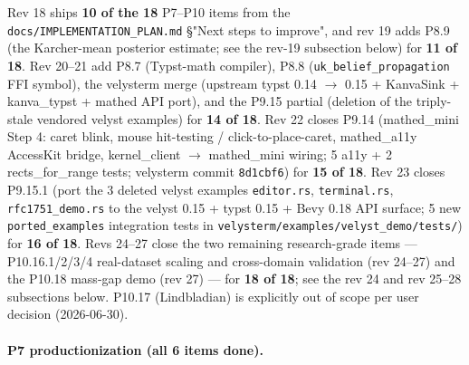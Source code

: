 \documentclass[11pt, a4paper]{article}
\begin{document}
Rev 18 ships \textbf{10 of the 18} P7--P10 items from the
\texttt{docs/IMPLEMENTATION\_PLAN.md} \S"Next steps to improve",
  and rev 19 adds P8.9 (the Karcher-mean posterior estimate; see the
rev-19 subsection below) for \textbf{11 of 18}.
Rev 20--21 add P8.7 (Typst-math compiler), P8.8
(\texttt{uk\_belief\_propagation} FFI symbol), the velysterm
merge (upstream typst 0.14 $\to$ 0.15 + KanvaSink + kanva\_typst
+ mathed API port), and the P9.15 partial (deletion of the
triply-stale vendored velyst examples) for \textbf{14 of 18}.
Rev 22 closes P9.14 (mathed\_mini Step 4: caret blink,
mouse hit-testing / click-to-place-caret, mathed\_a11y
AccessKit bridge, kernel\_client $\to$ mathed\_mini wiring;
5 a11y + 2 rects\_for\_range tests; velysterm commit
\texttt{8d1cbf6}) for \textbf{15 of 18}.
Rev 23 closes P9.15.1 (port the 3 deleted velyst examples
\texttt{editor.rs}, \texttt{terminal.rs}, \texttt{rfc1751\_demo.rs}
to the velyst 0.15 + typst 0.15 + Bevy 0.18 API surface;
5 new \texttt{ported\_examples} integration tests in
\texttt{velysterm/examples/velyst\_demo/tests/}) for
\textbf{16 of 18}.
Revs 24--27 close the two remaining research-grade items ---
P10.16.1/2/3/4 real-dataset scaling and cross-domain validation
(rev 24--27) and the P10.18 mass-gap demo (rev 27) --- for
\textbf{18 of 18}; see the rev 24 and rev 25--28 subsections below.
P10.17 (Lindbladian) is explicitly out of scope per user decision
(2026-06-30).

\paragraph{P7 productionization (all 6 items done).}
\end{document}
